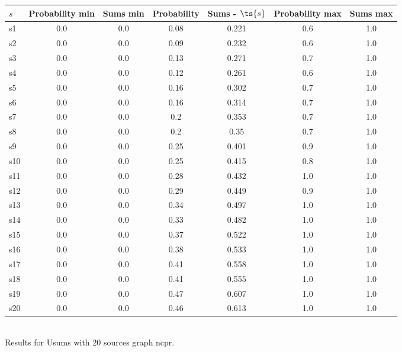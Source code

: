 \documentclass{article}
\begin{document}
\noindent\begin{tabular}{|l|c|c|c|c|c|c|}
\hline
$s$& Probability min & Sums min & Probability & Sums - $\ts{s}$ & Probability max & Sums max\\
\hline
s1 &0.0 & 0.0 & 0.08 & 0.221 & 0.6 & 1.0\\
\hline
s2 &0.0 & 0.0 & 0.09 & 0.232 & 0.6 & 1.0\\
\hline
s3 &0.0 & 0.0 & 0.13 & 0.271 & 0.7 & 1.0\\
\hline
s4 &0.0 & 0.0 & 0.12 & 0.261 & 0.6 & 1.0\\
\hline
s5 &0.0 & 0.0 & 0.16 & 0.302 & 0.7 & 1.0\\
\hline
s6 &0.0 & 0.0 & 0.16 & 0.314 & 0.7 & 1.0\\
\hline
s7 &0.0 & 0.0 & 0.2 & 0.353 & 0.7 & 1.0\\
\hline
s8 &0.0 & 0.0 & 0.2 & 0.35 & 0.7 & 1.0\\
\hline
s9 &0.0 & 0.0 & 0.25 & 0.401 & 0.9 & 1.0\\
\hline
s10 &0.0 & 0.0 & 0.25 & 0.415 & 0.8 & 1.0\\
\hline
s11 &0.0 & 0.0 & 0.28 & 0.432 & 1.0 & 1.0\\
\hline
s12 &0.0 & 0.0 & 0.29 & 0.449 & 0.9 & 1.0\\
\hline
s13 &0.0 & 0.0 & 0.34 & 0.497 & 1.0 & 1.0\\
\hline
s14 &0.0 & 0.0 & 0.33 & 0.482 & 1.0 & 1.0\\
\hline
s15 &0.0 & 0.0 & 0.37 & 0.522 & 1.0 & 1.0\\
\hline
s16 &0.0 & 0.0 & 0.38 & 0.533 & 1.0 & 1.0\\
\hline
s17 &0.0 & 0.0 & 0.41 & 0.558 & 1.0 & 1.0\\
\hline
s18 &0.0 & 0.0 & 0.41 & 0.555 & 1.0 & 1.0\\
\hline
s19 &0.0 & 0.0 & 0.47 & 0.607 & 1.0 & 1.0\\
\hline
s20 &0.0 & 0.0 & 0.46 & 0.613 & 1.0 & 1.0\\
\hline
\end{tabular}\\

\noindent Results for Usums with 20 sources graph ncpr.
\end{document}
